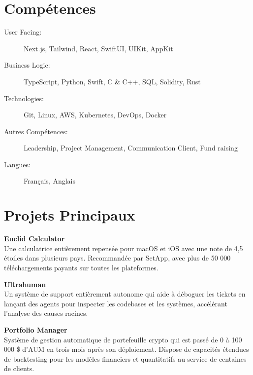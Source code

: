 \documentclass[margin,line]{resume}
\begin{document}
\begin{resume}
    \section{\mysidestyle Compétences}\vspace{2mm}       
    \begin{description}
        \item[User Facing:] Next.js, Tailwind, React, SwiftUI, UIKit, AppKit
        \item[Business Logic:] TypeScript, Python, Swift, C \& C++, SQL, Solidity, Rust
        \item[Technologies:] Git, Linux, AWS, Kubernetes, DevOps, Docker
        \item[Autres Compétences:] Leadership, Project Management, Communication Client, Fund raising
        \item[Langues:] Français, Anglais
    \end{description}
     
    
    \section{\mysidestyle Projets Principaux}
    \begin{list2}
        \item \textbf{Euclid Calculator}\\
        Une calculatrice entièrement repensée pour macOS et iOS avec une note de 4,5 étoiles dans plusieurs pays. Recommandée par SetApp, avec plus de 50 000 téléchargements payants sur toutes les plateformes.
        \vspace{1mm}
        \item \textbf{Ultrahuman}\\
        Un système de support entièrement autonome qui aide à déboguer les tickets en lançant des agents pour inspecter les codebases et les systèmes, accélérant l'analyse des causes racines.
        \vspace{1mm}
        \item \textbf{Portfolio Manager}\\
        Système de gestion automatique de portefeuille crypto qui est passé de 0 à 100 000 \$ d'AUM en trois mois après son déploiement. Dispose de capacités étendues de backtesting pour les modèles financiers et quantitatifs au service de centaines de clients.
    \end{list2}



\end{resume}
\end{document}
